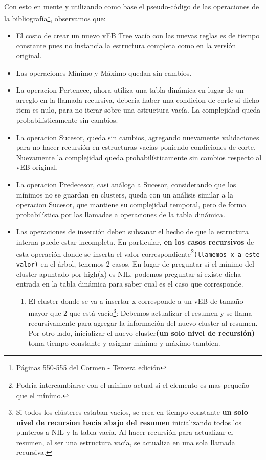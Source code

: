 \documentclass[10pt,a4paper]{article}
\begin{document}
Con esto en mente y utilizando como base el pseudo-código de las operaciones de la bibliografía\footnote{Páginas 550-555 del Cormen - Tercera edición}, observamos que:
\begin{itemize}
\item El costo de crear un nuevo vEB Tree vacío con las nuevas reglas es de tiempo constante pues no instancia la estructura completa como en la versión original.
\item Las operaciones Mínimo y Máximo quedan sin cambios.
\item La operacion Pertenece, ahora utiliza una tabla dinámica en lugar de un arreglo en la llamada recursiva, deberia haber una condicion de corte si dicho item es nulo, para no iterar sobre una estructura vacía. La complejidad queda probabilísticamente sin cambios.
\item La operacion Sucesor, queda sin cambios, agregando nuevamente validaciones para no hacer recursión en estructuras vacias poniendo condiciones de corte. Nuevamente la complejidad queda probabilísticamente sin cambios respecto al vEB original.
\item La operacion Predecesor, casi análoga a Sucesor, considerando que los mínimos no se guardan en clusters, queda con un análisis similar a la operacion Sucesor, que mantiene su complejidad temporal, pero de forma probabilística por las llamadas a operaciones de la tabla dinámica.

\item Las operaciones de inserción deben subsanar el hecho de que la estructura interna puede estar incompleta. En particular, \textbf{en los casos recursivos} de esta operación donde se inserta el valor correspondiente\footnote{Podria intercambiarse con el mínimo actual si el elemento es mas pequeño que el mínimo.}\texttt{(llamemos x a este valor)} en el árbol, tenemos 2 casos. En lugar de preguntar si el mínimo del cluster apuntado por high(x) es NIL, podemos preguntar si existe dicha entrada en la tabla dinámica para saber cual es el caso que corresponde. 
    \begin{enumerate}
        \item El cluster donde se va a insertar x corresponde a un vEB de tamaño mayor que 2 que está vacío\footnote{Si todos los clústeres estaban vacíos, se crea en tiempo constante \textbf{un solo nivel de recursion hacia abajo del resumen} inicializando todos los punteros a NIL y la tabla vacía. Al hacer recursión para actualizar el resumen, al ser una estructura vacía, se actualiza en una sola llamada recursiva.}: 
        Debemos actualizar el resumen y se llama recursivamente para agregar la información del nuevo cluster al resumen. Por otro lado, inicializar el nuevo cluster\textbf{(un solo nivel de recursión)} toma tiempo constante y asignar mínimo y máximo tambien.
        

\end{enumerate}
\end{itemize}
\end{document}
